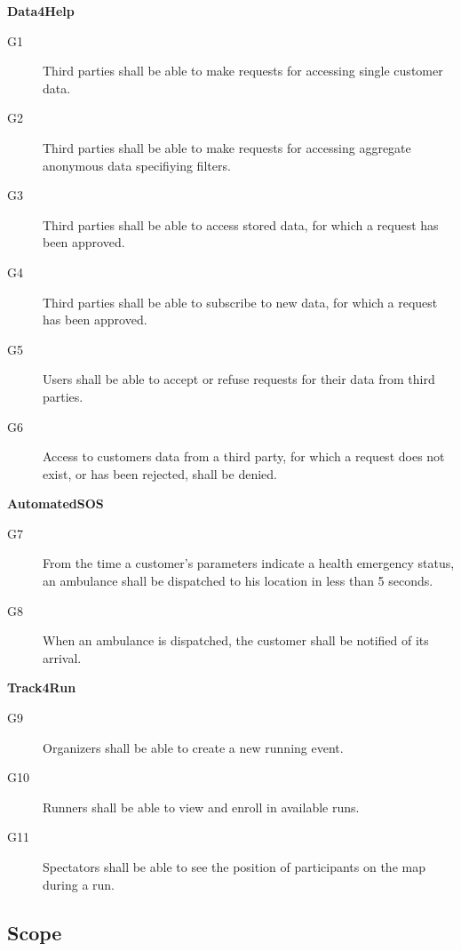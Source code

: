 \documentclass[../main.tex]{subfiles}
\begin{document}
\begin{minipage}{\textwidth}
{\bf Data4Help}
\begin{description}
	\item [G1]  Third parties shall be able to make requests for accessing single customer data.
	\item [G2]  Third parties shall be able to make requests for accessing aggregate anonymous data specifiying filters.
	\item [G3]  Third parties shall be able to access stored data, for which a request has been approved.
	\item [G4]  Third parties shall be able to subscribe to new data, for which a request has been approved.
	\item [G5]  Users shall be able to accept or refuse requests for their data from third parties.
	\item [G6]  Access to customers data from a third party, for which a request does not exist, or has been rejected, shall be denied.
\end{description}
\end{minipage}
\vspace{8mm}

\begin{minipage}{\textwidth}
{\bf AutomatedSOS}
\begin{description}
	\item [G7]  From the time a customer's parameters indicate a health emergency status, an ambulance shall be dispatched to his location in less than 5 seconds.
	\item [G8]  When an ambulance is dispatched, the customer shall be notified of its arrival.
\end{description}
\end{minipage}
\vspace{8mm}

\begin{minipage}{\textwidth}
{\bf Track4Run}
\begin{description}
	\item [G9]   Organizers shall be able to create a new running event.
	\item [G10]  Runners shall be able to view and enroll in available runs.
	\item [G11]  Spectators shall be able to see the position of participants on the map during a run.
\end{description}
\end{minipage}

\subsection{Scope}
\end{document}
